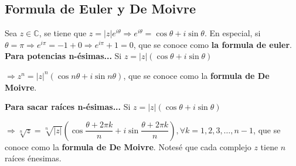 \documentclass[12pt]{article}
\begin{document}
\subsection*{Formula de Euler y De Moivre}
\noindent Sea $z\in\mathbb{C}$, se tiene que $z=|z|e^{i\theta}\Rightarrow e^{i\theta}=\cos{\theta}+i\sin{\theta}$. En especial, si $\theta=\pi\Rightarrow e^{i\pi}=-1+0\Rightarrow e^{i\pi}+1=0$, que se conoce como \textbf{la formula de euler}.
\newline
\newline
\textbf{Para potencias n-ésimas...}\newline
\noindent Si $z=|z|(\cos{\theta}+i\sin{\theta})$
\begin{center}
    $\Rightarrow z^n=|z|^n(\cos{n\theta}+i\sin{n\theta})$, que se conoce como la \textbf{formula de De Moivre}.
\end{center}
\noindent \textbf{Para sacar raíces n-ésimas...}\newline
\noindent Si $z=|z|(\cos{\theta}+i\sin{\theta})$
\begin{center}
    $\Rightarrow \sqrt[n]{z}=\sqrt[n]{|z|}\left(\cos{\dfrac{\theta+2\pi k}{n}}+i\sin{\dfrac{\theta+2\pi k}{n}}\right), \forall k=1,2,3,\dots,n-1$, que se conoce como la \textbf{formula de De Moivre}. Notesé que
    cada complejo $z$ tiene $n$ raíces énesimas.
\end{center}
\end{document}
